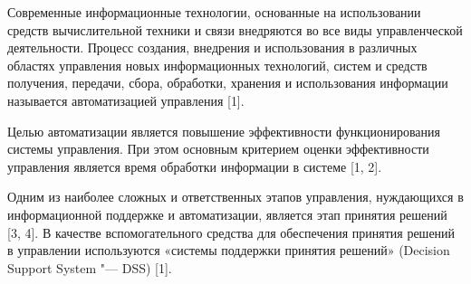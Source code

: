 










\renewcommand{\baselinestretch}{.87}



\maketitle



Современные информационные технологии, основанные на использовании средств вычислительной техники и связи внедряются во все виды управленческой деятельности. Процесс создания, внедрения и использования в различных областях управления новых информационных технологий, систем и средств получения, передачи, сбора, обработки, хранения и использования информации называется автоматизацией управления [1].



Целью автоматизации является повышение эффективности функционирования системы управления. При этом основным критерием оценки эффективности управления является время обработки информации в системе [1, 2].



Одним из наиболее сложных и ответственных этапов управления, нуждающихся в информационной поддержке и автоматизации, является этап принятия решений [3, 4]. В качестве вспомогательного средства для обеспечения принятия решений в управлении используются «системы поддержки принятия решений» (Decision Support System "--- DSS) [1].



